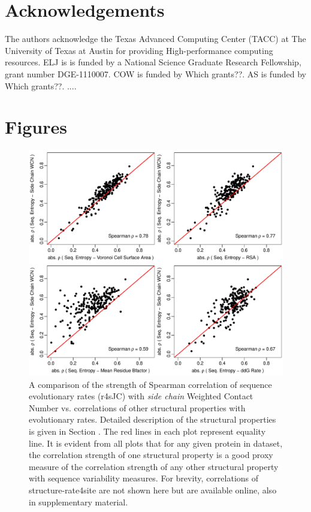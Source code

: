 \documentclass[12pt]{article}
\begin{document}
\section{Acknowledgements}
The authors acknowledge the Texas Advanced Computing Center (TACC) at The University of Texas at Austin for providing High-performance computing resources. ELJ is is funded by a National Science Graduate Research Fellowship, grant number DGE-1110007. COW is funded by {\color{red} Which grants??}.  AS is funded by {\color{red} Which grants??}.
....




\section*{Figures}
    \begin{figure}[tbh]
            \begin{center}
            \includegraphics[width=6.9in]{cordiv_similarities_seqent.pdf}
            \end{center}
            \caption{A comparison of the strength of Spearman correlation of sequence evolutionary rates (r4sJC) with {\it side chain} Weighted Contact Number vs. correlations of other structural properties with evolutionary rates. Detailed description of the structural properties is given in Section \label{sec:mam}. The red lines in each plot represent equality line. It is evident from all plots that for any given protein in dataset, the correlation strength of one structural property is a good proxy measure of the correlation strength of any other structural property with sequence variability measures. For brevity, correlations of structure-rate4site are not shown here but are available online, also in supplementary material.}
            \label{fig:seqent_structure_cors}
    \end{figure}
\end{document}
